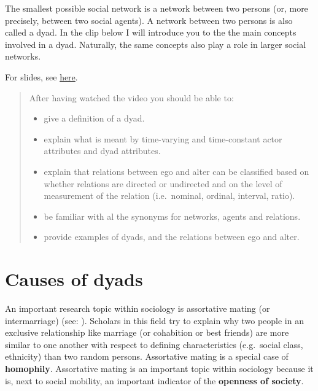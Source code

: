 \documentclass[
]{book}
\providecommand{\tightlist}{%
  \setlength{\itemsep}{0pt}\setlength{\parskip}{0pt}}
\begin{document}
The smallest possible social network is a network between two persons (or, more precisely, between two social agents). A network between two persons is also called a dyad. In the clip below I will introduce you to the the main concepts involved in a dyad. Naturally, the same concepts also play a role in larger social networks.

For slides, see \href{dyads.pdf}{here}.

\begin{quote}
After having watched the video you should be able to:

\begin{itemize}
\tightlist
\item
  give a definition of a dyad.\\
\item
  explain what is meant by time-varying and time-constant actor attributes and dyad attributes.\\
\item
  explain that relations between ego and alter can be classified based on whether relations are directed or undirected and on the level of measurement of the relation (i.e.~nominal, ordinal, interval, ratio).\\
\item
  be familiar with al the synonyms for networks, agents and relations.\\
\item
  provide examples of dyads, and the relations between ego and alter.\\
\end{itemize}
\end{quote}

\hypertarget{causes-of-dyads}{%
\section{Causes of dyads}\label{causes-of-dyads}}

An important research topic within sociology is assortative mating (or intermarriage) (see: \citep{kalmijn1998, schwartz2013, blossfeld2009}). Scholars in this field try to explain why two people in an exclusive relationship like marriage (or cohabition or best friends) are more similar to one another with respect to defining characteristics (e.g.~social class, ethnicity) than two random persons. Assortative mating is a special case of \textbf{homophily}. Assortative mating is an important topic within sociology because it is, next to social mobility, an important indicator of the \textbf{openness of society}.~
\end{document}
